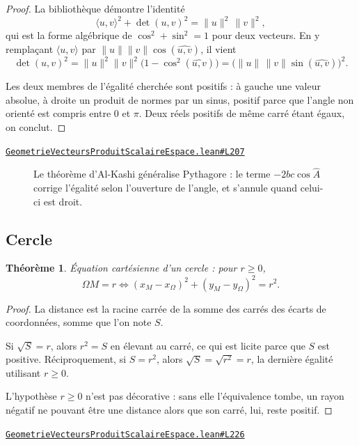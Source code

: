 \documentclass[11pt,a4paper]{article}
\theoremstyle{definition}
\theoremstyle{plain}
\newtheorem{theoreme}{Théorème}
\newcommand{\source}[2]{\par\smallskip\noindent\hfill{\footnotesize\href{#1}{\texttt{#2}}}\par\smallskip}
\begin{document}
\begin{proof}
La bibliothèque démontre l'identité
\[ \langle u, v\rangle^{2} + \det(u, v)^{2} = \|u\|^{2}\,\|v\|^{2} , \]
qui est la forme algébrique de \og{} $\cos^{2} + \sin^{2} = 1$ \fg{} pour deux vecteurs.
En y remplaçant $\langle u, v\rangle$ par $\|u\|\|v\|\cos(\widehat{u,v})$, il vient
\[ \det(u, v)^{2}
   = \|u\|^{2}\|v\|^{2}\bigl(1 - \cos^{2}(\widehat{u,v})\bigr)
   = \bigl(\|u\|\,\|v\|\sin(\widehat{u,v})\bigr)^{2} . \]

Les deux membres de l'égalité cherchée sont positifs : à gauche une valeur absolue, à
droite un produit de normes par un sinus, positif parce que l'angle non orienté est compris
entre $0$ et $\pi$. Deux réels positifs de même carré étant égaux, on conclut.
\end{proof}
\source{https://github.com/Commutator-IO/learn-lean/blob/main/courses/02-lycee/08-geometrie-vecteurs-produit-scalaire-espace/GeometrieVecteursProduitScalaireEspace.lean\#L207}{GeometrieVecteursProduitScalaireEspace.lean\#L207}

\begin{figure}[h]
\centering

\caption{Le théorème d'Al-Kashi généralise Pythagore : le terme $-2bc\cos \hat A$ corrige l'égalité selon l'ouverture de l'angle, et s'annule quand celui-ci est droit.}
\end{figure}

\subsection{Cercle}

\begin{theoreme}
Équation cartésienne d'un cercle : pour $r \ge 0$,
\[ \Omega M = r \iff (x_M - x_\Omega)^{2} + (y_M - y_\Omega)^{2} = r^{2} . \]
\end{theoreme}

\begin{proof}
La distance est la racine carrée de la somme des carrés des écarts de coordonnées, somme
que l'on note $S$.

Si $\sqrt{S} = r$, alors $r^{2} = S$ en élevant au carré, ce qui est licite parce que $S$
est positive. Réciproquement, si $S = r^{2}$, alors $\sqrt{S} = \sqrt{r^{2}} = r$, la
dernière égalité utilisant $r \ge 0$.

\medskip\noindent
L'hypothèse $r \ge 0$ n'est pas décorative : sans elle l'équivalence tombe, un rayon
négatif ne pouvant être une distance alors que son carré, lui, reste positif.
\end{proof}
\source{https://github.com/Commutator-IO/learn-lean/blob/main/courses/02-lycee/08-geometrie-vecteurs-produit-scalaire-espace/GeometrieVecteursProduitScalaireEspace.lean\#L226}{GeometrieVecteursProduitScalaireEspace.lean\#L226}
\end{document}
